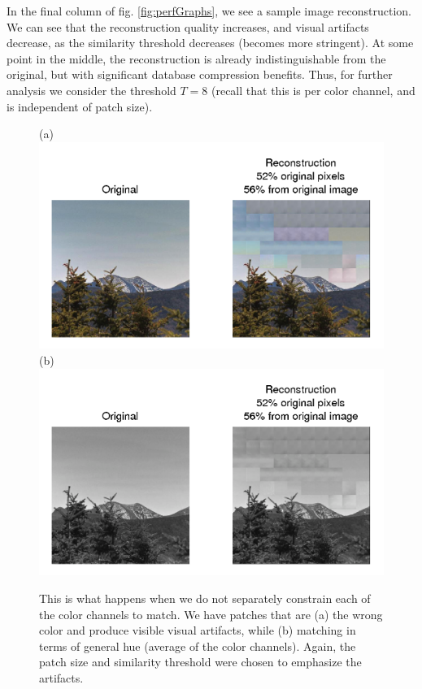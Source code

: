 In the final column of fig. \ref{fig:perfGraphs}, we see a sample image reconstruction. We can see that the reconstruction quality increases, and visual artifacts decrease, as the similarity threshold decreases (becomes more stringent). At some point in the middle, the reconstruction is already indistinguishable from the original, but with significant database compression benefits. Thus, for further analysis we consider the threshold $T=8$ (recall that this is per color channel, and is independent of patch size).


 \begin{figure}
(a)\includegraphics[width=0.9\linewidth]{Figures/197.png}
(b)\includegraphics[width=0.9\linewidth]{Figures/197_bw.png}
\caption{This is what happens when we do not separately constrain each of the color channels to match. We have patches that are (a) the wrong color and produce visible visual artifacts, while (b) matching in terms of general hue (average of the color channels). Again, the patch size and similarity threshold were chosen to emphasize the artifacts.}
\label{fig:colProblem}
\end{figure}

